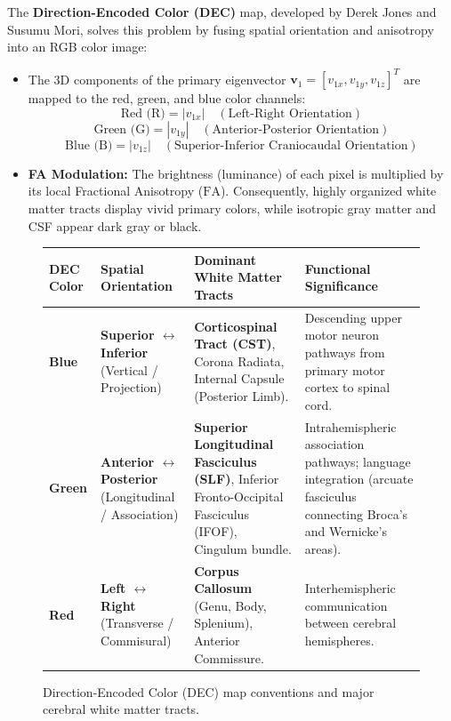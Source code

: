 \documentclass[11pt,a4paper]{article}
\begin{document}
The \textbf{Direction-Encoded Color (DEC)} map, developed by Derek Jones and Susumu Mori, solves this problem by fusing spatial orientation and anisotropy into an RGB color image:
\begin{itemize}[leftmargin=*]
    \item The 3D components of the primary eigenvector $\mathbf{v}_1 = [v_{1x}, v_{1y}, v_{1z}]^T$ are mapped to the red, green, and blue color channels:
    \begin{equation}
        \text{Red (R)} = |v_{1x}| \quad (\text{Left-Right Orientation})
    \end{equation}
    \begin{equation}
        \text{Green (G)} = |v_{1y}| \quad (\text{Anterior-Posterior Orientation})
    \end{equation}
    \begin{equation}
        \text{Blue (B)} = |v_{1z}| \quad (\text{Superior-Inferior Craniocaudal Orientation})
    \end{equation}
    \item \textbf{FA Modulation:} The brightness (luminance) of each pixel is multiplied by its local Fractional Anisotropy ($\text{FA}$). Consequently, highly organized white matter tracts display vivid primary colors, while isotropic gray matter and CSF appear dark gray or black.
\end{itemize}

\begin{figure}[htbp]
\centering
\setlength{\tabcolsep}{4pt}
\begin{tabular}{p{2.8cm}p{3.2cm}p{4.2cm}p{4.6cm}}
\toprule
\textbf{DEC Color} & \textbf{Spatial Orientation} & \textbf{Dominant White Matter Tracts} & \textbf{Functional Significance} \\
\midrule
\textbf{Blue} & \textbf{Superior $\leftrightarrow$ Inferior} (Vertical / Projection) & \textbf{Corticospinal Tract (CST)}, Corona Radiata, Internal Capsule (Posterior Limb). & Descending upper motor neuron pathways from primary motor cortex to spinal cord. \\
\addlinespace
\textbf{Green} & \textbf{Anterior $\leftrightarrow$ Posterior} (Longitudinal / Association) & \textbf{Superior Longitudinal Fasciculus (SLF)}, Inferior Fronto-Occipital Fasciculus (IFOF), Cingulum bundle. & Intrahemispheric association pathways; language integration (arcuate fasciculus connecting Broca's and Wernicke's areas). \\
\addlinespace
\textbf{Red} & \textbf{Left $\leftrightarrow$ Right} (Transverse / Commisural) & \textbf{Corpus Callosum} (Genu, Body, Splenium), Anterior Commissure. & Interhemispheric communication between cerebral hemispheres. \\
\bottomrule
\end{tabular}
\caption{Direction-Encoded Color (DEC) map conventions and major cerebral white matter tracts.}
\label{tab:dec_tracts}
\end{figure}
\end{document}
